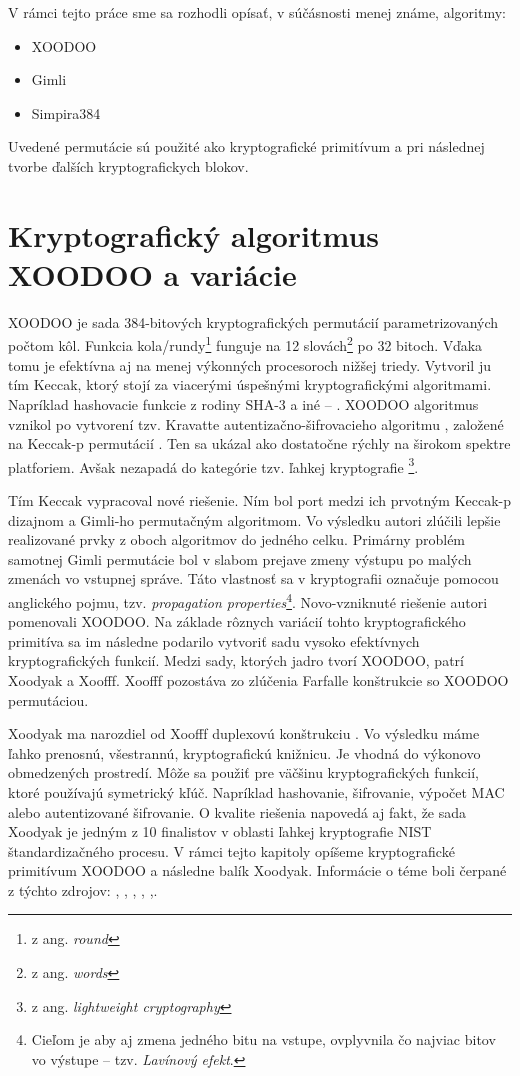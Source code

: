 V rámci tejto práce sme sa rozhodli opísať, v súčásnosti menej známe, algoritmy: 
\begin{itemize}
	\item XOODOO \cite{tkecak}
	\item Gimli \cite{gimli}
	\item Simpira384 \cite{simpira}
\end{itemize}  
Uvedené permutácie sú použité ako kryptografické primitívum a pri následnej tvorbe ďalších kryptografickych blokov. 

\section{Kryptografický algoritmus XOODOO a variácie} 
XOODOO je sada 384-bitových kryptografických permutácií parametrizovaných počtom kôl. Funkcia kola/rundy\footnote{z ang. \textit{round}} funguje na 12 slovách\footnote{z ang. \textit{words}} po 32 bitoch. Vďaka tomu je efektívna aj na menej výkonných procesoroch nižšej triedy. Vytvoril ju tím Keccak, ktorý stojí za viacerými úspešnými kryptografickými algoritmami. Napríklad hashovacie funkcie z rodiny SHA-3 a iné -- \cite{kecsup}. XOODOO algoritmus vznikol po vytvorení tzv. Kravatte autentizačno-šifrovacieho algoritmu \cite{kravatte}, založené na Keccak-p permutácií \cite{keccakp}. Ten sa ukázal ako dostatočne rýchly na širokom spektre platforiem. Avšak nezapadá do kategórie tzv. ľahkej kryptografie \footnote{z ang. \textit{lightweight cryptography}}.

Tím Keccak vypracoval nové riešenie. Ním bol port medzi ich prvotným Keccak-p dizajnom a Gimli-ho \cite{bernstein2017gimli} permutačným algoritmom. Vo výsledku autori zlúčili lepšie realizované prvky z oboch algoritmov do jedného celku. Primárny problém samotnej Gimli permutácie bol v slabom prejave zmeny výstupu po malých zmenách vo vstupnej správe. Táto vlastnosť sa v kryptografii označuje pomocou anglického pojmu, tzv. \textit{propagation properties}\footnote{Cieľom je aby aj zmena jedného bitu na vstupe, ovplyvnila čo najviac bitov vo výstupe -- tzv. \textit{Lavínový efekt}.}. Novo-vzniknuté riešenie autori pomenovali XOODOO. Na základe rôznych variácií tohto kryptografického primitíva sa im následne podarilo vytvoriť sadu vysoko efektívnych kryptografických funkcií. 
Medzi sady, ktorých jadro tvorí XOODOO, patrí Xoodyak a Xoofff. Xoofff pozostáva zo zlúčenia Farfalle konštrukcie \cite{farfalle} so XOODOO permutáciou. 

Xoodyak ma narozdiel od Xoofff duplexovú konštrukciu \cite{duplex}. Vo výsledku máme ľahko prenosnú, všestrannú, kryptografickú knižnicu. Je vhodná do výkonovo obmedzených prostredí. Môže sa použiť pre väčšinu kryptografických funkcií, ktoré používajú symetrický kľúč. Napríklad hashovanie, šifrovanie, výpočet MAC alebo autentizované šifrovanie. O kvalite riešenia napovedá aj fakt, že sada Xoodyak je jedným z 10 finalistov v oblasti ľahkej kryptografie NIST štandardizačného procesu.
V rámci tejto kapitoly opíšeme kryptografické primitívum XOODOO a následne balík Xoodyak. Informácie o téme boli čerpané z týchto zdrojov: \cite{tkecak}, \cite{xd}, \cite{xcb}, \cite{xoodoocb}, \cite{xdupdate},\cite{xdr1}.
